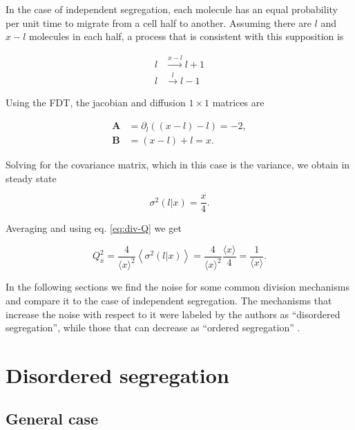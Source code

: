 In the case of independent segregation, each molecule has an equal probability per unit time to migrate from a cell half to another. Assuming there are $l$ and $x-l$ molecules in each half, a process that is consistent with this supposition is

\begin{equation}
  \label{eq:div-arr_ind}
  \begin{split}
    l&\xrightarrow{x-l}l+1\\
    l&\xrightarrow{l}l-1
  \end{split}
\end{equation}

Using the FDT, the jacobian and diffusion $1\times1$ matrices are

\begin{equation*}
  \begin{split}
    \mathbf{A} &= \partial_l\left((x-l)-l\right) = -2,\\
    \mathbf{B} &= (x-l)+l = x.
  \end{split}
\end{equation*}

Solving for the covariance matrix, which in this case is the variance, we obtain in steady state

\begin{equation}
  \label{eq:div-var_ind}
  \sigma^2(l|x) = \frac{x}{4}.
\end{equation}

Averaging and using eq. \eqref{eq:div-Q} we get

\begin{equation}
  \label{div-Rindep}
  Q_x^2 = \frac{4}{\langle x\rangle^2}\left\langle\sigma^2(l|x)\right\rangle = \frac{4}{\langle x\rangle^2}\frac{\langle x\rangle}{4} = \frac{1}{\langle x\rangle}.
\end{equation}

In the following sections we find the noise for some common division mechanisms and compare it to the case of independent segregation. The mechanisms that increase the noise with respect to it were labeled by the authors as ``disordered segregation'', while those that can decrease as ``ordered segregation'' \cite{huh11b}.

\section{Disordered segregation}

\subsection{General case}

